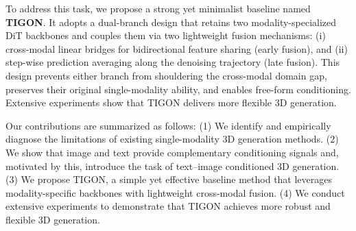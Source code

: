 To address this task, we propose a strong yet minimalist baseline named \textbf{TIGON}. It adopts a dual-branch design that retains two modality-specialized DiT backbones and couples them via two lightweight fusion mechanisms: (i) cross-modal linear bridges for bidirectional feature sharing (early fusion), and (ii) step-wise prediction averaging along the denoising trajectory (late fusion). This design prevents either branch from shouldering the cross-modal domain gap, preserves their original single-modality ability, and enables free-form conditioning. Extensive experiments show that TIGON delivers more flexible 3D generation.

Our contributions are summarized as follows: (1) We identify and empirically diagnose the limitations of existing single-modality 3D generation methods. (2) We show that image and text provide complementary conditioning signals and, motivated by this, introduce the task of text–image conditioned 3D generation. (3) We propose TIGON, a simple yet effective baseline method that leverages modality-specific backbones with lightweight cross-modal fusion. (4) We conduct extensive experiments to demonstrate that TIGON achieves more robust and flexible 3D generation.